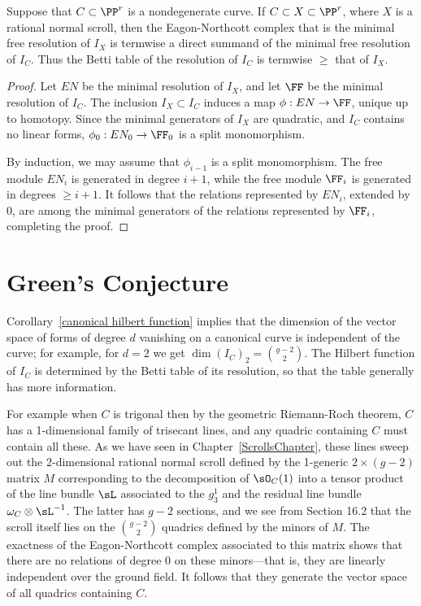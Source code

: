 \begin{proposition}
Suppose that $C\subset \PP^r$ is a nondegenerate curve. If $C\subset X \subset \PP^r$, where $X$ is a rational
normal scroll, then the Eagon-Northcott complex that is  the minimal free resolution of $I_X$ is termwise a direct summand
of the minimal free resolution of $I_C$. Thus the Betti table of the resolution of $I_C$ is termwise $\geq$ that of $I_X$.
\end{proposition}

\begin{proof}
Let $EN$ be the minimal resolution of $I_X$, and let $\FF$ be the minimal resolution of $I_C$.
The inclusion $I_X \subset I_C$ induces a map $\phi: EN\to \FF$, unique up to homotopy. Since the minimal generators of $I_X$ are quadratic, and $I_C$ contains no linear forms, $\phi_0: EN_0\to \FF_0$ is a split monomorphism.

By induction, we may assume that $\phi_{i-1}$ is a split monomorphism. The free module $EN_{i}$ is generated in 
degree $i+1$, while the free module $\FF_i$ is generated in degrees $\geq i+1$. It follows that the relations
represented by $EN_i$, extended by 0, are among the minimal generators of the relations represented by $\FF_i$,
completing the proof.
 \end{proof}
 
\section{Green's Conjecture}

Corollary~\ref{canonical hilbert function} implies that the dimension of the vector space of forms of degree $d$
vanishing on a canonical curve is independent of the curve; for example, for $d=2$ we get
$
\dim ({I_{C}})_{2} = {g-2\choose 2}.
$
The Hilbert function of $I_C$ is determined by the Betti table of its resolution, so that the table generally has more information.

 For example
when $C$ is trigonal then by the geometric Riemann-Roch theorem, $C$ has a 1-dimensional family of trisecant lines, and any quadric containing $C$ must contain all these. As we have seen in Chapter~\ref{ScrollsChapter}, these lines sweep
out the 2-dimensional rational normal scroll defined by the 1-generic $2\times (g-2)$ matrix $M$ corresponding to the decomposition of $\sO_C(1)$
into a tensor product of the  line bundle $\sL$ associated to the $g^{1}_{3}$ and the residual line bundle $\omega_{C}\otimes \sL^{-1}$. The latter has $g-2$ sections, and we see from Section 16.2
that the scroll itself lies on the ${g-2\choose 2}$ quadrics defined by the minors of $M$. The exactness of the Eagon-Northcott complex associated to this matrix shows that there are no relations of degree 0 on these minors---that is, they are linearly independent over the ground field. It follows that they generate the vector space of all quadrics containing $C$. 



